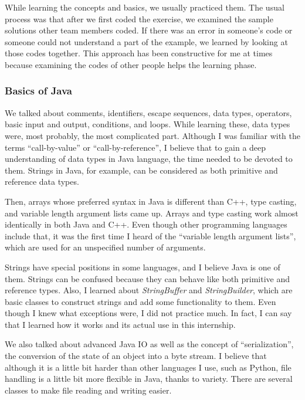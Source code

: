 While learning the concepts and basics, we usually practiced them. The usual process was that after we first coded the exercise, we examined the sample solutions other team members coded. If there was an error in someone's code or someone could not understand a part of the example, we learned by looking at those codes together. This approach has been constructive for me at times because examining the codes of other people helps the learning phase.

\subsubsection{Basics of Java}

We talked about comments, identifiers, escape sequences, data types, operators, basic input and output, conditions, and loops. While learning these, data types were, most probably, the most complicated part. Although I was familiar with the terms ``call-by-value'' or ``call-by-reference'', I believe that to gain a deep understanding of data types in Java language, the time needed to be devoted to them. Strings in Java, for example, can be considered as both primitive and reference data types.

Then, arrays whose preferred syntax in Java is different than C++, type casting, and variable length argument lists came up. Arrays and type casting work almost identically in both Java and C++. Even though other programming languages include that, it was the first time I heard of the ``variable length argument lists'', which are used for an unspecified number of arguments.

Strings have special positions in some languages, and I believe Java is one of them. Strings can be confused because they can behave like both primitive and reference types. Also, I learned about \textit{StringBuffer} and \textit{StringBuilder}, which are basic classes to construct strings and add some functionality to them. Even though I knew what exceptions were, I did not practice much. In fact, I can say that I learned how it works and its actual use in this internship.

We also talked about advanced Java IO as well as the concept of ``serialization'',  the conversion of the state of an object into a byte stream. I believe that although it is a little bit harder than other languages I use, such as Python, file handling is a little bit more flexible in Java, thanks to variety. There are several classes to make file reading and writing easier.

